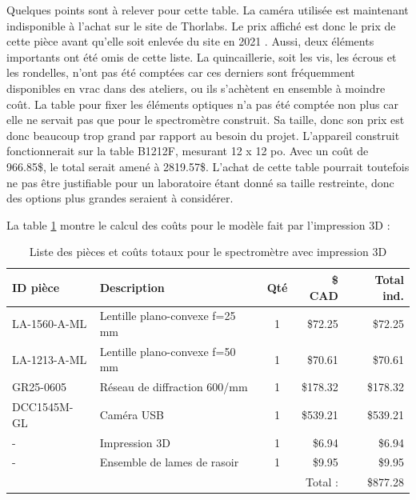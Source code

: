\documentclass[11pt,letterpaper]{article}
\begin{document}
Quelques points sont à relever pour cette table. La caméra utilisée est maintenant indisponible
à l'achat sur le site de Thorlabs. Le prix affiché est donc le prix de cette pièce avant
qu'elle soit enlevée du site en 2021 \cite{noauthor_thorlabs_2021}. Aussi, deux éléments importants
ont été omis de cette liste. La quincaillerie, soit les vis, les écrous et les 
rondelles, n'ont pas été comptées car ces derniers sont fréquemment disponibles en vrac dans
des ateliers, ou ils s'achètent en ensemble à moindre coût. La table pour fixer les éléments 
optiques n'a pas été comptée non plus car elle ne servait pas que pour le spectromètre 
construit. Sa taille, donc son prix est donc beaucoup trop grand par rapport au besoin du projet. L'appareil
construit fonctionnerait sur la table B1212F, mesurant 12 x 12 po. Avec un coût de 966.85\$,
le total serait amené à 2819.57\$. L'achat de cette table pourrait toutefois ne pas être 
justifiable pour un laboratoire étant donné sa taille restreinte, donc des options plus grandes
seraient à considérer.


La table \ref{prix_3D} montre le calcul des coûts pour le modèle fait par l'impression 3D :

\begin{table}[!ht]
    \centering
    \caption{Liste des pièces et coûts totaux pour le spectromètre avec impression 3D \cite{noauthor_thorlabs_2024} \cite{noauthor_razor_2024}}
    \begin{tabular}{|l|l|c|r|r|}
    \hline
        ID pièce & Description & Qté & \$ CAD & Total ind. \\ \hline\hline
        LA-1560-A-ML & Lentille plano-convexe f=25 mm & 1 & \$72.25 & \$72.25 \\ \hline
        LA-1213-A-ML & Lentille plano-convexe f=50 mm & 1 & \$70.61 & \$70.61 \\ \hline
        GR25-0605 & Réseau de diffraction 600/mm & 1 & \$178.32 & \$178.32 \\ \hline
        DCC1545M-GL & Caméra USB & 1 & \$539.21 & \$539.21 \\ \hline
        - & Impression 3D & 1 & \$6.94 & \$6.94 \\ \hline
        - & Ensemble de lames de rasoir & 1 & \$9.95 & \$9.95 \\ \hline\hline
        ~ & ~ & ~ & Total : & \$877.28 \\ \hline
    \end{tabular}
    \label{prix_3D}
\end{table}
\end{document}
